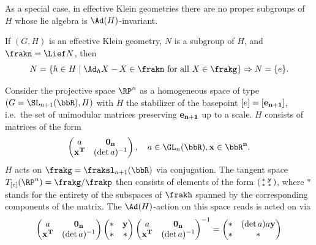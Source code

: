 As a special case, in effective Klein geometries there are no proper subgroups of $H$ whose lie algebra is $\Ad(H)$-invariant.

\begin{cor}\label{Cor 4.2 Sharpe}
    If $(G,H)$ is an effective Klein geometry, $N$ is a subgroup of $H$, and $\frakn=\Lief N$, then
    \[N=\{h\in H\mid \Ad_h X-X\in\frakn \text{ for all }X\in\frakg\}\Rightarrow N=\{e\}.\]
\end{cor}

\begin{example}\label{ex real projective Klein model}
    Consider the projective space $\RP^n$ as a homogeneous space of type $(G=\SL_{n+1}(\bbR),H)$ with $H$ the stabilizer of the basepoint $[e]=[\bf{e}_{n+1}]$, i.e.\ the set of unimodular matrices preserving $\bf{e}_{n+1}$ up to a scale. $H$ consists of matrices of the form 
    \[ \begin{pmatrix}
        a & \bf{0}_n \\
        \bf{x}^T & (\det a)^{-1} 
    \end{pmatrix},\quad a\in \GL_n(\bbR),\bf{x}\in\bbR^n.\]
    $H$ acts on $\frakg=\fraksl_{n+1}(\bbR)$ via conjugation. The tangent space $T_{[e]}(\RP^n)=\frakg\slash\frakp$ then consists of elements of the form 
    $\left(\begin{smallmatrix}
        \ast & \bf{y} \\
        \ast & \ast
    \end{smallmatrix}\right)$, where $\ast$ stands for the entirety of the subspaces of $\frakh$ spanned by the corresponding components of the matrix. The $\Ad(H)$-action on this space reads 
    is acted on via 
    \[\begin{pmatrix}
        a & \bf{0}_n\\
        \bf{x}^T & (\det a)^{-1}
    \end{pmatrix}
    \begin{pmatrix}
        \ast & \bf{y} \\
        \ast & \ast 
    \end{pmatrix}
    \begin{pmatrix}
        a & \bf{0}_n\\
        \bf{x}^T & (\det a)^{-1}
    \end{pmatrix}^{-1}=
    \begin{pmatrix}
        \ast & (\det a) a\bf{y} \\
        \ast & \ast

\end{pmatrix}\]
\end{example}

